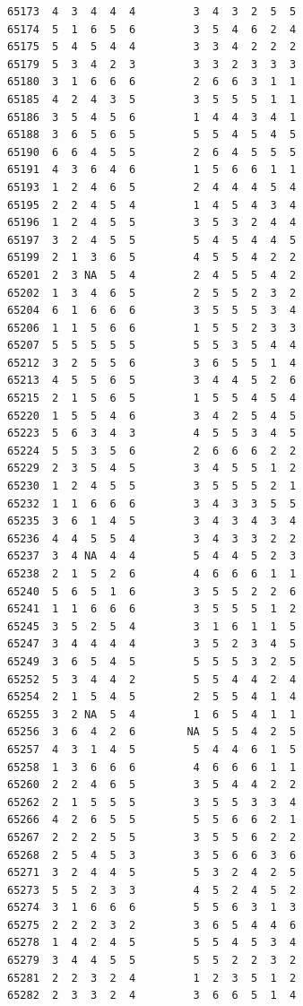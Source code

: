 \documentclass[
  letterpaper,
  DIV=11,
  numbers=noendperiod]{scrreprt}
\begin{document}
\begin{verbatim}
65173  4  3  4  4  4         3  4  3  2  5  5
65174  5  1  6  5  6         3  5  4  6  2  4
65175  5  4  5  4  4         3  3  4  2  2  2
65179  5  3  4  2  3         3  3  2  3  3  3
65180  3  1  6  6  6         2  6  6  3  1  1
65185  4  2  4  3  5         3  5  5  5  1  1
65186  3  5  4  5  6         1  4  4  3  4  1
65188  3  6  5  6  5         5  5  4  5  4  5
65190  6  6  4  5  5         2  6  4  5  5  5
65191  4  3  6  4  6         1  5  6  6  1  1
65193  1  2  4  6  5         2  4  4  4  5  4
65195  2  2  4  5  4         1  4  5  4  3  4
65196  1  2  4  5  5         3  5  3  2  4  4
65197  3  2  4  5  5         5  4  5  4  4  5
65199  2  1  3  6  5         4  5  5  4  2  2
65201  2  3 NA  5  4         2  4  5  5  4  2
65202  1  3  4  6  5         2  5  5  2  3  2
65204  6  1  6  6  6         3  5  5  5  3  4
65206  1  1  5  6  6         1  5  5  2  3  3
65207  5  5  5  5  5         5  5  3  5  4  4
65212  3  2  5  5  6         3  6  5  5  1  4
65213  4  5  5  6  5         3  4  4  5  2  6
65215  2  1  5  6  5         1  5  5  4  5  4
65220  1  5  5  4  6         3  4  2  5  4  5
65223  5  6  3  4  3         4  5  5  3  4  5
65224  5  5  3  5  6         2  6  6  6  2  2
65229  2  3  5  4  5         3  4  5  5  1  2
65230  1  2  4  5  5         3  5  5  5  2  1
65232  1  1  6  6  6         3  4  3  3  5  5
65235  3  6  1  4  5         3  4  3  4  3  4
65236  4  4  5  5  4         3  4  3  3  2  2
65237  3  4 NA  4  4         5  4  4  5  2  3
65238  2  1  5  2  6         4  6  6  6  1  1
65240  5  6  5  1  6         3  5  5  2  2  6
65241  1  1  6  6  6         3  5  5  5  1  2
65245  3  5  2  5  4         3  1  6  1  1  5
65247  3  4  4  4  4         3  5  2  3  4  5
65249  3  6  5  4  5         5  5  5  3  2  5
65252  5  3  4  4  2         5  5  4  4  2  4
65254  2  1  5  4  5         2  5  5  4  1  4
65255  3  2 NA  5  4         1  6  5  4  1  1
65256  3  6  4  2  6        NA  5  5  4  2  5
65257  4  3  1  4  5         5  4  4  6  1  5
65258  1  3  6  6  6         4  6  6  6  1  1
65260  2  2  4  6  5         3  5  4  4  2  2
65262  2  1  5  5  5         3  5  5  3  3  4
65266  4  2  6  5  5         5  5  6  6  2  1
65267  2  2  2  5  5         3  5  5  6  2  2
65268  2  5  4  5  3         3  5  6  6  3  6
65271  3  2  4  4  5         5  3  2  4  2  5
65273  5  5  2  3  3         4  5  2  4  5  2
65274  3  1  6  6  6         5  5  6  3  1  3
65275  2  2  2  3  2         3  6  5  4  4  6
65278  1  4  2  4  5         5  5  4  5  3  4
65279  3  4  4  5  5         5  5  2  2  3  2
65281  2  2  3  2  4         1  2  3  5  1  2
65282  2  3  3  2  4         3  6  6  5  1  4

\end{verbatim}
\end{document}
